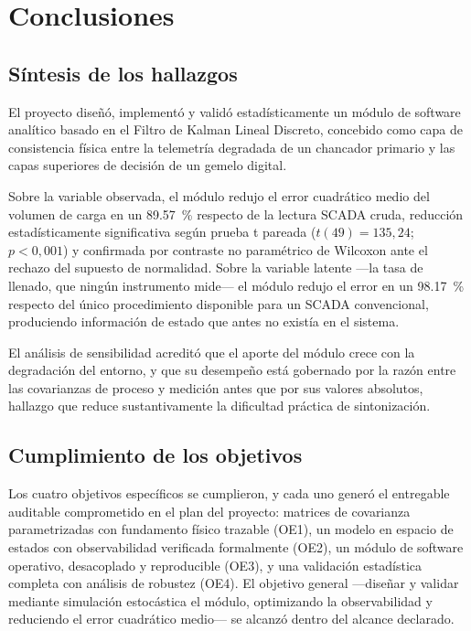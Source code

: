 \section{Conclusiones}
\label{sec:conclusiones}

\subsection{Síntesis de los hallazgos}

El proyecto diseñó, implementó y validó estadísticamente un módulo de software
analítico basado en el Filtro de Kalman Lineal Discreto, concebido como capa de
consistencia física entre la telemetría degradada de un chancador primario y las
capas superiores de decisión de un gemelo digital.

Sobre la variable observada, el módulo redujo el error cuadrático medio del
volumen de carga en un \SI{89,57}{\percent} respecto de la lectura SCADA cruda,
reducción estadísticamente significativa según prueba t pareada
($t(49) = 135{,}24$; $p < 0{,}001$) y confirmada por contraste no paramétrico de
Wilcoxon ante el rechazo del supuesto de normalidad. Sobre la variable latente
—la tasa de llenado, que ningún instrumento mide— el módulo redujo el error en
un \SI{98,17}{\percent} respecto del único procedimiento disponible para un
SCADA convencional, produciendo información de estado que antes no existía en el
sistema.

El análisis de sensibilidad acreditó que el aporte del módulo crece con la
degradación del entorno, y que su desempeño está gobernado por la razón entre
las covarianzas de proceso y medición antes que por sus valores absolutos,
hallazgo que reduce sustantivamente la dificultad práctica de sintonización.

\subsection{Cumplimiento de los objetivos}

Los cuatro objetivos específicos se cumplieron, y cada uno generó el entregable
auditable comprometido en el plan del proyecto: matrices de covarianza
parametrizadas con fundamento físico trazable (OE1), un modelo en espacio de
estados con observabilidad verificada formalmente (OE2), un módulo de software
operativo, desacoplado y reproducible (OE3), y una validación estadística
completa con análisis de robustez (OE4). El objetivo general —diseñar y validar
mediante simulación estocástica el módulo, optimizando la observabilidad y
reduciendo el error cuadrático medio— se alcanzó dentro del alcance declarado.

